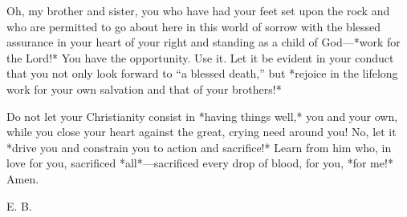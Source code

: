 Oh, my brother and sister, you who have had your feet set upon the rock and who are permitted to go about here in this world of sorrow with the blessed assurance in your heart of your right and standing as a child of God—*work for the Lord!* You have the opportunity. Use it. Let it be evident in your conduct that you not only look forward to “a blessed death,” but *rejoice in the lifelong work for your own salvation and that of your brothers!*

Do not let your Christianity consist in *having things well,* you and your own, while you close your heart against the great, crying need around you! No, let it *drive you and constrain you to action and sacrifice!* Learn from him who, in love for you, sacrificed *all*—sacrificed every drop of blood, for you, *for me!* Amen.

E. B.
